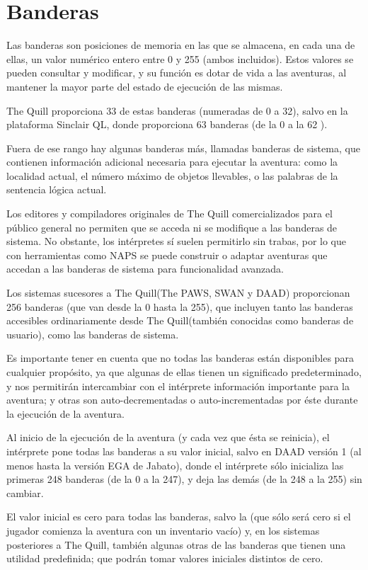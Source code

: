 \documentclass[11pt, a5paper]{article}
\newcommand{\quill}{\textsf{The Quill}\xspace}
\newcommand{\paw}{\textsf{The PAWS}\xspace}
\newcommand{\swan}{\textsf{SWAN}\xspace}
\newcommand{\daad}{\textsf{DAAD}\xspace}
\begin{document}
\section{Banderas}

Las banderas son posiciones de memoria en las que se almacena, en cada una de ellas, un valor numérico entero entre 0 y 255 (ambos incluidos). Estos valores se pueden consultar y modificar, y su función es dotar de vida a las aventuras, al mantener la mayor parte del estado de ejecución de las mismas.

\quill proporciona 33 de estas banderas (numeradas de 0 a 32), salvo en la plataforma Sinclair QL, donde proporciona 63 banderas (de la 0 a la 62 \cite{QuillQL}).

Fuera de ese rango hay algunas banderas más, llamadas banderas de sistema, que contienen información adicional necesaria para ejecutar la aventura: como la localidad actual, el número máximo de objetos llevables, o las palabras de la sentencia lógica actual.

Los editores y compiladores originales de \quill comercializados para el público general no permiten que se acceda ni se modifique a las banderas de sistema. No obstante, los intérpretes sí suelen permitirlo sin trabas, por lo que con herramientas como NAPS\cite{NAPS} se puede construir o adaptar aventuras que accedan a las banderas de sistema para funcionalidad avanzada.

Los sistemas sucesores a \quill (\paw, \swan y \daad) proporcionan 256 banderas (que van desde la 0 hasta la 255), que incluyen tanto las banderas accesibles ordinariamente desde \quill (también conocidas como banderas de usuario), como las banderas de sistema.

Es importante tener en cuenta que no todas las banderas están disponibles para cualquier propósito, ya que algunas de ellas tienen un significado predeterminado, y nos permitirán intercambiar con el intérprete información importante para la aventura; y otras son auto-decrementadas o auto-incrementadas por éste durante la ejecución de la aventura.

Al inicio de la ejecución de la aventura (y cada vez que ésta se reinicia), el intérprete pone todas las banderas a su valor inicial, salvo en \daad versión 1 (al menos hasta la versión EGA de Jabato), donde el intérprete sólo inicializa las primeras 248 banderas (de la 0 a la 247), y deja las demás (de la 248 a la 255) sin cambiar.

El valor inicial es cero para todas las banderas, salvo la \textbf{} (que sólo será cero si el jugador comienza la aventura con un inventario vacío) y, en los sistemas posteriores a \quill, también algunas otras de las banderas que tienen una utilidad predefinida; que podrán tomar valores iniciales distintos de cero.
\end{document}
